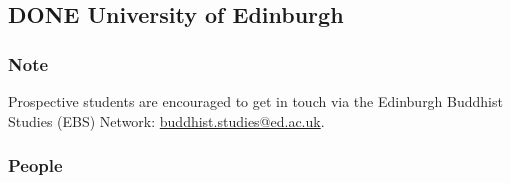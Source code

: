 \documentclass[11pt]{article}
\begin{document}
\subsection*{{\bfseries\sffamily DONE} University of Edinburgh}
\label{sec:org6ed5ff8}
\subsubsection*{Note}
\label{sec:org3c42358}
Prospective students are encouraged to get in touch via the Edinburgh Buddhist Studies (EBS) Network: \href{mailto:buddhist.studies@ed.ac.uk}{buddhist.studies@ed.ac.uk}.\\
\subsubsection*{People}
\label{sec:orga1a332b}
\end{document}
